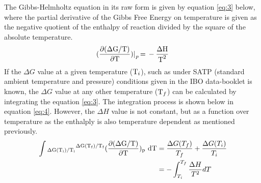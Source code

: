 \documentclass{article}
\begin{document}
The Gibbs-Helmholtz equation in its raw form is given by equation \ref{eq:3} below, where the partial derivative of the Gibbs Free Energy on temperature is given as the negative quotient of the enthalpy of reaction divided by the square of the absolute temperature.
\begin{equation}
\ce{(\frac{\partial(\Delta G/T)}{\partial T})|_p = - \frac{\Delta H}{T^2}} \label{eq:3}
\end{equation}
If the $\Delta G$ value at a given temperature ($\ce{T_i}$), such as under SATP (standard ambient temperature and pressure) conditions given in the IBO data-booklet is known, the $\Delta G$ value at any other temperature ($\ce{T_f}$) can be calculated by integrating the equation \ref{eq:3}. The integration process is shown below in equation \ref{eq:4}. However, the $\Delta H$ value is not constant, but as a function over temperature as the enthalply is also temperature dependent as mentioned previously.
\begin{equation}
\begin{split}
\ce{\int_{\Delta G(T_i)/T_i}^{\Delta G(T_f)/T_f}{(\frac{\partial (\Delta G/T)}{\partial T})_p dT}} &= \frac{\Delta G(T_f)}{T_f} + \frac{\Delta G(T_i)}{T_i} \label{eq:4} \\
&= -\int_{T_i}^{T_f} \frac{\Delta H}{T^2} dT 
\end{split}
\end{equation}
\end{document}
